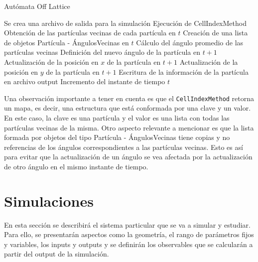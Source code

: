 \documentclass[11pt, a4paper]{article}
\begin{document}
            \begin{algorithm}
                \caption{Autómata Off Lattice}
                \begin{algorithmic}[1]
                    \State Se crea una archivo de salida para la simulación
                            \State Ejecución de CellIndexMethod
                            \State Obtención de las partículas vecinas de cada partícula en $t$
                            \State Creación de una lista de objetos Partícula - ÁngulosVecinas en $t$
                                \State Cálculo del ángulo promedio de las partículas vecinas
                                \State Definición del nuevo ángulo de la partícula en $t+1$
                                \State Actualización de la posición en $x$ de la partícula en $t+1$
                                \State Actualización de la posición en $y$ de la partícula en $t+1$
                                \State Escritura de la información de la partícula en archivo output
                            \EndFor
                            \State Incremento del instante de tiempo $t$
                        \EndWhile
                \end{algorithmic}
                \label{alg:algorithm}
            \end{algorithm}

            Una observación importante a tener en cuenta es que el \texttt{CellIndexMethod} retorna un mapa, es decir, una estructura
            que está conformada por una clave y un valor.
            En este caso, la clave es una partícula y el valor es una lista con todas las partículas vecinas de la misma.
            Otro aspecto relevante a mencionar es que la lista formada por objetos del tipo Partícula - ÁngulosVecinas
            tiene copias y no referencias de los ángulos correspondientes a las partículas vecinas.
            Esto es así para evitar que la actualización de un ángulo se vea afectada por la actualización de otro
            ángulo en el mismo instante de tiempo.

    \newpage

    \section{Simulaciones}
    \label{sec:simulaciones}

        En esta sección se describirá el sistema particular que se va a simular y estudiar. Para ello, se
        presentarán aspectos como la geometría, el rango de parámetros fijos y variables, los inputs y outputs
        y se definirán los observables que se calcularán a partir del output de la simulación.
\end{document}
